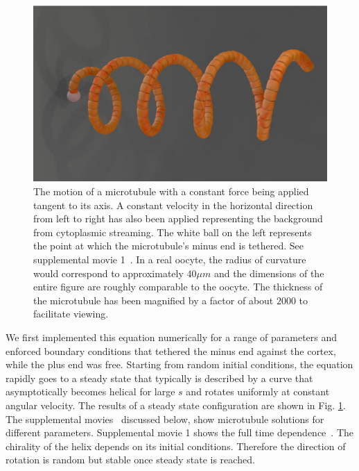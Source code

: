 \documentclass[11pt]{ucthesis}
\begin{document}
\begin{figure}[htp]
\begin{center}
\includegraphics[width=\hsize]{simulation1.eps}
\caption{ 
The motion of a microtubule with a constant force being applied tangent to its axis. 
A constant velocity in the horizontal direction  from left to right has also been applied representing
the background from cytoplasmic streaming. The white ball on the left represents
the point at which the microtubule's minus end is tethered. See supplemental
movie 1~\cite{SupplMovies}. In a real oocyte, the radius of curvature would
correspond to approximately $40 \mu m$ and the dimensions of the entire figure are
roughly comparable to the oocyte. The thickness of the microtubule has been magnified
by a factor of about $2000$ to facilitate viewing.
}
\label{fig:simulation}
\end{center}
\end{figure}


We first implemented this equation numerically for a range of parameters
and enforced boundary conditions that tethered the minus end against the cortex, while
the plus end was free. Starting from random initial conditions, the equation rapidly goes to a steady state that
typically is described by a curve that asymptotically becomes helical for large $s$ and rotates uniformly at constant
angular velocity. The results of a steady state configuration are shown in Fig. \ref{fig:simulation}. 
The supplemental movies~\cite{SupplMovies} discussed below, show microtubule solutions for different
parameters.
Supplemental movie 1 shows the full time dependence~\cite{SupplMovies}. The chirality of the helix depends on its initial conditions.
Therefore the direction of rotation is random but stable once steady state is reached.
\end{document}

